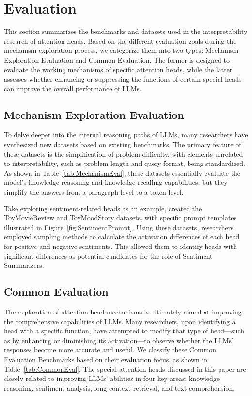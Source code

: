 \documentclass{article}
\begin{document}
\section{Evaluation} \label{sec:Evaluation}
This section summarizes the benchmarks and datasets used in the interpretability research of attention heads. Based on the different evaluation goals during the mechanism exploration process, we categorize them into two types: Mechanism Exploration Evaluation and Common Evaluation. The former is designed to evaluate the working mechanisms of specific attention heads, while the latter assesses whether enhancing or suppressing the functions of certain special heads can improve the overall performance of LLMs.


\subsection{Mechanism Exploration Evaluation}
To delve deeper into the internal reasoning paths of LLMs, many researchers have synthesized new datasets based on existing benchmarks. The primary feature of these datasets is the simplification of problem difficulty, with elements unrelated to interpretability, such as problem length and query format, being standardized. As shown in Table~\ref{tab:MechanismEval}, these datasets essentially evaluate the model's knowledge reasoning and knowledge recalling capabilities, but they simplify the answers from a paragraph-level to a token-level.

Take exploring sentiment-related heads as an example, \citet{Sentiment_23_arXiv_EleutherAI} created the ToyMovieReview and ToyMoodStory datasets, with specific prompt templates illustrated in Figure~\ref{fig:SentimentPrompt}. Using these datasets, researchers employed sampling methods to calculate the activation differences of each head for positive and negative sentiments. This allowed them to identify heads with significant differences as potential candidates for the role of Sentiment Summarizers.


\subsection{Common Evaluation}
The exploration of attention head mechanisms is ultimately aimed at improving the comprehensive capabilities of LLMs. Many researchers, upon identifying a head with a specific function, have attempted to modify that type of head—such as by enhancing or diminishing its activation—to observe whether the LLMs' responses become more accurate and useful. We classify these Common Evaluation Benchmarks based on their evaluation focus, as shown in Table~\ref{tab:CommonEval}. The special attention heads discussed in this paper are closely related to improving LLMs' abilities in four key areas: knowledge reasoning, sentiment analysis, long context retrieval, and text comprehension.
\end{document}
